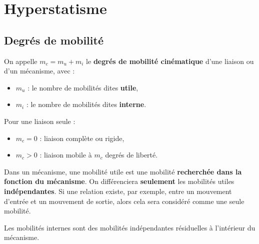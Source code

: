 \documentclass[10pt,fleqn]{article} %
\begin{document}
			


\section{Hyperstatisme}



	\subsection{Degrés de mobilité}

	
		
		\begin{definition}
		On appelle $m_c=m_u+m_i$ le \textbf{degrés de mobilité cinématique} d'une liaison ou d'un mécanisme, avec :
			\begin{itemize}
				\item $m_u$ : le nombre de mobilités dites \textbf{utile},
				\item $m_i$ : le nombre de mobilités dites \textbf{interne}.
			\end{itemize}
		\end{definition}

		Pour une liaison seule :
		\begin{itemize}
			\item $m_c=0$ : liaison complète ou rigide,
			\item $m_c>0$ : liaison mobile à $m_c$ degrés de liberté.
		\end{itemize}

		\begin{rem}
			\item Dans un mécanisme, une mobilité utile est une mobilité \textbf{recherchée dans la fonction du mécanisme}.
				On différenciera \textbf{seulement} les mobilités utiles \textbf{indépendantes}.
				Si une relation existe, par exemple, entre un mouvement d'entrée et un mouvement de sortie, alors cela sera considéré comme une seule mobilité.
			\item Les mobilités internes sont des mobilités indépendantes résiduelles à l'intérieur du mécanisme.
		\end{rem}






\end{document}
